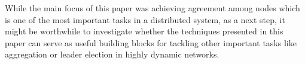 \documentclass[leqno,11pt]{article}
\begin{document}
While the main focus of this paper was achieving agreement among nodes
which is one of the most important tasks in a distributed system, as a next step, it might be worthwhile to investigate whether the techniques presented in this paper can serve  as useful building blocks for tackling other important tasks
like aggregation or leader election in highly dynamic networks.



\end{document}
